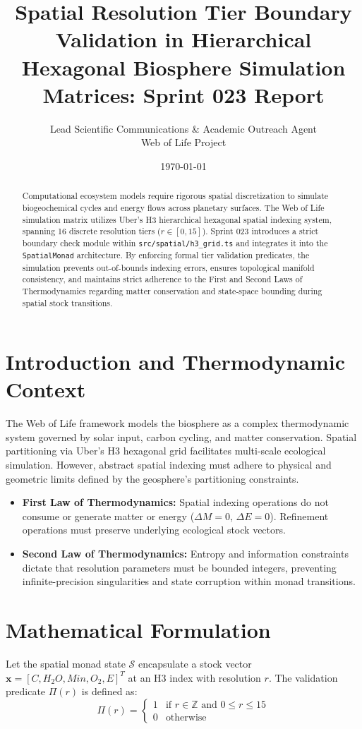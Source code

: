 \documentclass[11pt, a4paper]{article}
\title{\textbf{Spatial Resolution Tier Boundary Validation in Hierarchical Hexagonal Biosphere Simulation Matrices: Sprint 023 Report}}
\author{Lead Scientific Communications \& Academic Outreach Agent \\ Web of Life Project}
\date{\today}
\begin{document}
\maketitle

\begin{abstract}
Computational ecosystem models require rigorous spatial discretization to simulate biogeochemical cycles and energy flows across planetary surfaces. The Web of Life simulation matrix utilizes Uber's H3 hierarchical hexagonal spatial indexing system, spanning 16 discrete resolution tiers ($r \in [0, 15]$). Sprint 023 introduces a strict boundary check module within \texttt{src/spatial/h3\_grid.ts} and integrates it into the \texttt{SpatialMonad} architecture. By enforcing formal tier validation predicates, the simulation prevents out-of-bounds indexing errors, ensures topological manifold consistency, and maintains strict adherence to the First and Second Laws of Thermodynamics regarding matter conservation and state-space bounding during spatial stock transitions.
\end{abstract}

\section{Introduction and Thermodynamic Context}
The Web of Life framework models the biosphere as a complex thermodynamic system governed by solar input, carbon cycling, and matter conservation. Spatial partitioning via Uber's H3 hexagonal grid facilitates multi-scale ecological simulation. However, abstract spatial indexing must adhere to physical and geometric limits defined by the geosphere's partitioning constraints.

\begin{itemize}
    \item \textbf{First Law of Thermodynamics:} Spatial indexing operations do not consume or generate matter or energy ($\Delta M = 0$, $\Delta E = 0$). Refinement operations must preserve underlying ecological stock vectors.
    \item \textbf{Second Law of Thermodynamics:} Entropy and information constraints dictate that resolution parameters must be bounded integers, preventing infinite-precision singularities and state corruption within monad transitions.
\end{itemize}

\section{Mathematical Formulation}
Let the spatial monad state $\mathcal{S}$ encapsulate a stock vector $\mathbf{x} = [C, H_2O, Min, O_2, E]^T$ at an H3 index with resolution $r$. The validation predicate $\Pi(r)$ is defined as:
\begin{equation}
\Pi(r) = \begin{cases} 
1 & \text{if } r \in \mathbb{Z} \text{ and } 0 \le r \le 15 \\ 
0 & \text{otherwise} 
\end{cases}
\end{equation}
\end{document}
